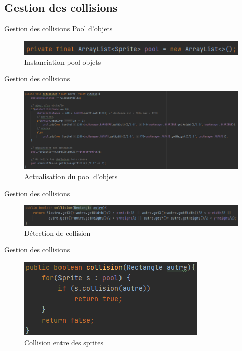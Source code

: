 \documentclass[t,12pt]{beamer}
\begin{document}
\subsection{Gestion des collisions}
\begin{frame}{Gestion des collisions}
Pool d'objets
\begin{figure}[h]
    \centering
    \includegraphics[scale=0.8]{poolObjets}
    \caption{Instanciation pool objets}
    \label{fig:instanciation pool objets}
\end{figure}
    
\end{frame}

\begin{frame}{Gestion des collisions}
    \begin{figure}[h]
        \centering
        \includegraphics[scale=0.37]{actuObjets}
        \caption{Actualisation du pool d'objets}
        \label{fig:ajout des objets}
    \end{figure}
\end{frame}

\begin{frame}{Gestion des collisions}
    \begin{figure}[h]
        \centering
        \includegraphics[scale=0.5]{fctColl}
        \caption{Détection de collision}
        \label{fig:my_label}
    \end{figure}
\end{frame}

\begin{frame}{Gestion des collisions}
    \begin{figure}[h]
        \centering
        \includegraphics{collision}
        \caption{Collision entre des sprites}
        \label{fig:collision entre sprite}
    \end{figure}
\end{frame}
\end{document}
